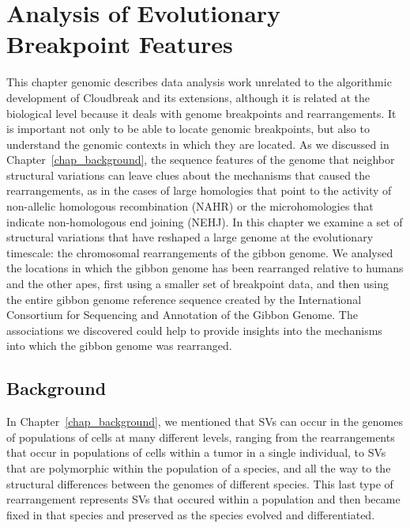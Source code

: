 \chapter{Analysis of Evolutionary Breakpoint Features}
\label{chap_breakpoint_analysis}

This chapter genomic describes data analysis work unrelated to the algorithmic development of Cloudbreak and its extensions, although it is related at the biological level because it deals with genome breakpoints and rearrangements. It is important not only to be able to locate genomic breakpoints, but also to understand the genomic contexts in which they are located. As we discussed in Chapter~\ref{chap_background}, the sequence features of the genome that neighbor structural variations can leave clues about the mechanisms that caused the rearrangements, as in the cases of large homologies that point to the activity of non-allelic homologous recombination (NAHR) or the microhomologies that indicate non-homologous end joining (NEHJ). In this chapter we examine a set of structural variations that have reshaped a large genome at the evolutionary timescale: the chromosomal rearrangements of the gibbon genome. We analysed the locations in which the gibbon genome has been rearranged relative to humans and the other apes, first using a smaller set of breakpoint data, and then using the entire gibbon genome reference sequence created by the International Consortium for Sequencing and Annotation of the Gibbon Genome. The associations we discovered could help to provide insights into the mechanisms into which the gibbon genome was rearranged. 

\section{Background}

In Chapter~\ref{chap_background}, we mentioned that SVs can occur in the genomes of populations of cells at many different levels, ranging from the rearrangements that occur in populations of cells within a tumor in a single individual, to SVs that are polymorphic within the population of a species, and all the way to the structural differences between the genomes of different species. This last type of rearrangement represents SVs that occured within a population and then became fixed in that species and preserved as the species evolved and differentiated. 

